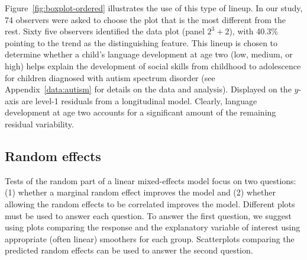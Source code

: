 \documentclass[12pt]{article} %
\newcommand{\al}[1]{{\color{ForestGreen} #1}}
\begin{document}
Figure~\ref{fig:boxplot-ordered} illustrates the use of this type of lineup. In our study, 74 observers were asked to choose the plot that is the most different from the rest. Sixty five \al{observers} identified the data plot (panel $2^3 + 2$), 
with 40.3\% pointing to the trend as the distinguishing feature. 
This lineup is chosen
to determine whether a child's language development at age two (low, medium, or high) helps explain the development of social skills from childhood to adolescence for children diagnosed with autism spectrum disorder (see Appendix~\ref{data:autism} for details on the data and analysis). Displayed on the $y$-axis are level-1 residuals from a longitudinal model. Clearly, language development at age two accounts for a significant amount of the remaining residual variability.




\subsection{Random effects} 
Tests of the random part of a linear mixed-effects model focus on two questions: (1) whether a marginal random effect improves the model and (2) whether allowing the random effects to be correlated improves the model. Different plots must be used to answer each question. To answer the first question, we suggest using plots comparing the response and the explanatory variable of interest using appropriate (often linear) smoothers for each group. Scatterplots comparing the predicted random effects can be used to answer the second question.
\end{document}
